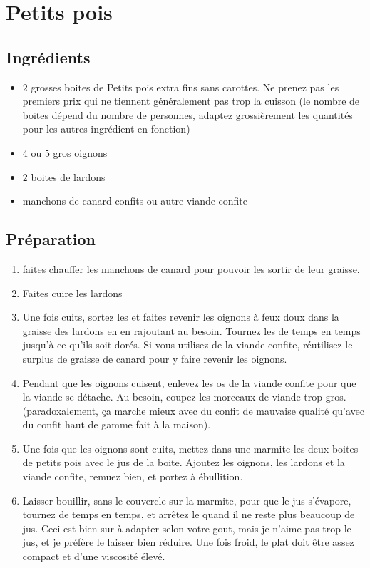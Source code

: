 \newpage
\section{Petits pois}
\subsection*{Ingrédients}
\begin{itemize}
\item $2$ grosses boites de Petits pois extra fins sans carottes. Ne prenez pas les premiers prix qui ne tiennent généralement pas trop la cuisson (le nombre de boites dépend du nombre de personnes, adaptez grossièrement les quantités pour les autres ingrédient en fonction)
\item $4$ ou $5$ gros oignons
\item $2$ boites de lardons
\item manchons de canard confits ou autre viande confite
\end{itemize}

\subsection*{Préparation}
\begin{enumerate}
\item faites chauffer les manchons de canard pour pouvoir les sortir de leur graisse.
\item Faites cuire les lardons
\item Une fois cuits, sortez les et faites revenir les oignons à feux doux dans la graisse des lardons en en rajoutant au besoin. Tournez les de temps en temps jusqu'à ce qu'ils soit dorés. Si vous utilisez de la viande confite, réutilisez le surplus de graisse de canard pour y faire revenir les oignons.
\item Pendant que les oignons cuisent, enlevez les os de la viande confite pour que la viande se détache. Au besoin, coupez les morceaux de viande trop gros. (paradoxalement, ça marche mieux avec du confit de mauvaise qualité qu'avec du confit haut de gamme fait à la maison).
\item Une fois que les oignons sont cuits, mettez dans une marmite les deux boites de petits pois avec le jus de la boite. Ajoutez les oignons, les lardons et la viande confite, remuez bien, et portez à ébullition.
\item Laisser bouillir, sans le couvercle sur la marmite, pour que le jus s'évapore, tournez de temps en temps, et arrêtez le quand il ne reste plus beaucoup de jus. Ceci est bien sur à adapter selon votre gout, mais je n'aime pas trop le jus, et je préfère le laisser bien réduire. Une fois froid, le plat doit être assez compact et d'une viscosité élevé.
\end{enumerate}

